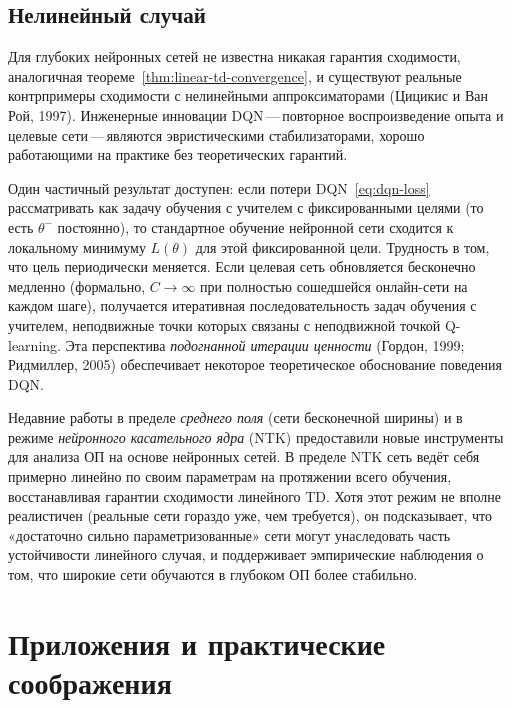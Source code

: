 \subsection{Нелинейный случай}

Для глубоких нейронных сетей не известна никакая гарантия сходимости, аналогичная теореме~\ref{thm:linear-td-convergence}, и существуют реальные контрпримеры сходимости с нелинейными аппроксиматорами (Цицикис и Ван Рой, 1997).  Инженерные инновации DQN\,---\,повторное воспроизведение опыта и целевые сети\,---\,являются эвристическими стабилизаторами, хорошо работающими на практике без теоретических гарантий.

Один частичный результат доступен: если потери DQN~\eqref{eq:dqn-loss} рассматривать как задачу обучения с учителем с фиксированными целями (то есть $\theta^-$ постоянно), то стандартное обучение нейронной сети сходится к локальному минимуму $L(\theta)$ для этой фиксированной цели.  Трудность в том, что цель периодически меняется.  Если целевая сеть обновляется бесконечно медленно (формально, $C \to \infty$ при полностью сошедшейся онлайн-сети на каждом шаге), получается итеративная последовательность задач обучения с учителем, неподвижные точки которых связаны с неподвижной точкой Q-learning.  Эта перспектива \emph{подогнанной итерации ценности} (Гордон, 1999; Ридмиллер, 2005) обеспечивает некоторое теоретическое обоснование поведения DQN.

\begin{remark}
\label{rem:mean-field}
Недавние работы в пределе \emph{среднего поля} (сети бесконечной ширины) и в режиме \emph{нейронного касательного ядра} (NTK) предоставили новые инструменты для анализа ОП на основе нейронных сетей.  В пределе NTK сеть ведёт себя примерно линейно по своим параметрам на протяжении всего обучения, восстанавливая гарантии сходимости линейного TD.  Хотя этот режим не вполне реалистичен (реальные сети гораздо уже, чем требуется), он подсказывает, что «достаточно сильно параметризованные» сети могут унаследовать часть устойчивости линейного случая, и поддерживает эмпирические наблюдения о том, что широкие сети обучаются в глубоком ОП более стабильно.
\end{remark}

\section{Приложения и практические соображения}
\label{sec:applications-vfa}

